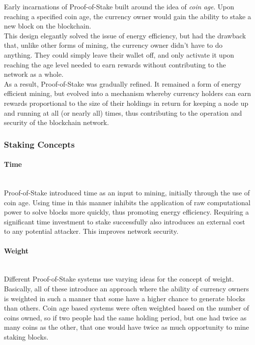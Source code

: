 \documentclass[11pt]{article}
\begin{document}
\noindent Early incarnations of Proof-of-Stake built around the idea of \textit{coin age}. Upon reaching a specified coin age, the currency owner would gain the ability to stake a new block on the blockchain.\\

\noindent This design elegantly solved the issue of energy efficiency, but had the drawback that, unlike other forms of mining, the currency owner didn't have to do anything. They could simply leave their wallet off, and only activate it upon reaching the age level needed to earn rewards without contributing to the network as a whole.\\

\noindent As a result, Proof-of-Stake was gradually refined. It remained a form of energy efficient mining, but evolved into a mechanism whereby currency holders can earn rewards proportional to the size of their holdings in return for keeping a node up and running at all (or nearly all) times, thus contributing to the operation and security of the blockchain network.\\

\subsubsection{Staking Concepts}

\paragraph{Time} ~\\
Proof-of-Stake introduced time as an input to mining, initially through the use of coin age. Using time in this manner inhibits the application of raw computational power to solve blocks more quickly, thus promoting energy efficiency. Requiring a significant time investment to stake successfully also introduces an external cost to any potential attacker. This improves network security. 

\paragraph{Weight} ~\\
Different Proof-of-Stake systems use varying ideas for the concept of weight. Basically, all of these introduce an approach where the ability of currency owners is weighted in such a manner that some have a higher chance to generate blocks than others. Coin age based systems were often weighted based on the number of coins owned, so if two people had the same holding period, but one had twice as many coins as the other, that one would have twice as much opportunity to mine staking blocks.
\end{document}
